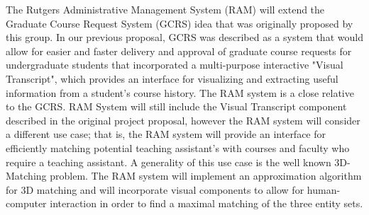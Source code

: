 The Rutgers Administrative Management System (RAM) will extend the Graduate Course Request System (GCRS) idea that was originally proposed by this group. In our previous proposal, GCRS was described as a system that would allow for easier and faster delivery and approval of graduate course requests for undergraduate students that incorporated a multi-purpose interactive "Visual Transcript", which provides an interface for visualizing and extracting useful information from a student's course history. The RAM system is a close relative to the GCRS. RAM System will still include the Visual Transcript component described in the original project proposal, however the RAM system will consider a different use case; that is, the RAM system will provide an interface for efficiently matching potential teaching assistant's with courses and faculty who require a teaching assistant. A generality of this use case is the well known 3D-Matching problem. The RAM system will implement an approximation algorithm for 3D matching and will incorporate visual components to allow for human-computer interaction in order to find a maximal matching of the three entity sets.